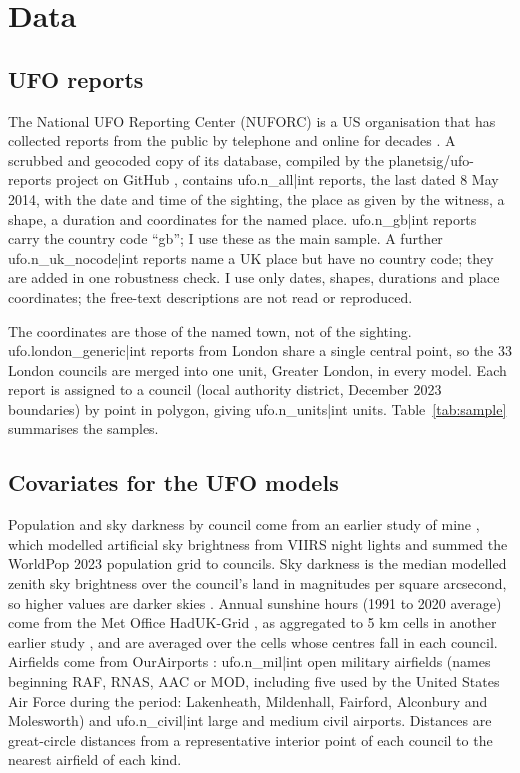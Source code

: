 \documentclass[11pt,a4paper]{article}
\begin{document}
\section{Data}\label{sec:data}
\subsection{UFO reports}
The National UFO Reporting Center (NUFORC) is a US organisation that has collected reports from the public by telephone and online for decades \citep{nuforc2026}. A scrubbed and geocoded copy of its database, compiled by the planetsig/ufo-reports project on GitHub \citep{planetsig}, contains {{ufo.n_all|int}} reports, the last dated 8 May 2014, with the date and time of the sighting, the place as given by the witness, a shape, a duration and coordinates for the named place. {{ufo.n_gb|int}} reports carry the country code ``gb''; I use these as the main sample. A further {{ufo.n_uk_nocode|int}} reports name a UK place but have no country code; they are added in one robustness check. I use only dates, shapes, durations and place coordinates; the free-text descriptions are not read or reproduced.

The coordinates are those of the named town, not of the sighting. {{ufo.london_generic|int}} reports from London share a single central point, so the 33 London councils are merged into one unit, Greater London, in every model. Each report is assigned to a council (local authority district, December 2023 boundaries) by point in polygon, giving {{ufo.n_units|int}} units. Table~\ref{tab:sample} summarises the samples.

\subsection{Covariates for the UFO models}
Population and sky darkness by council come from an earlier study of mine \citep{hotham2026dark}, which modelled artificial sky brightness from VIIRS night lights and summed the WorldPop 2023 population grid \citep{bondarenko2025} to councils. Sky darkness is the median modelled zenith sky brightness over the council's land in magnitudes per square arcsecond, so higher values are darker skies \citep{falchi2016}. Annual sunshine hours (1991 to 2020 average) come from the Met Office HadUK-Grid \citep{hollis2026}, as aggregated to 5 km cells in another earlier study \citep{hotham2026sun}, and are averaged over the cells whose centres fall in each council. Airfields come from OurAirports \citep{ourairports2026}: {{ufo.n_mil|int}} open military airfields (names beginning RAF, RNAS, AAC or MOD, including five used by the United States Air Force during the period: Lakenheath, Mildenhall, Fairford, Alconbury and Molesworth) and {{ufo.n_civil|int}} large and medium civil airports. Distances are great-circle distances from a representative interior point of each council to the nearest airfield of each kind.
\end{document}
